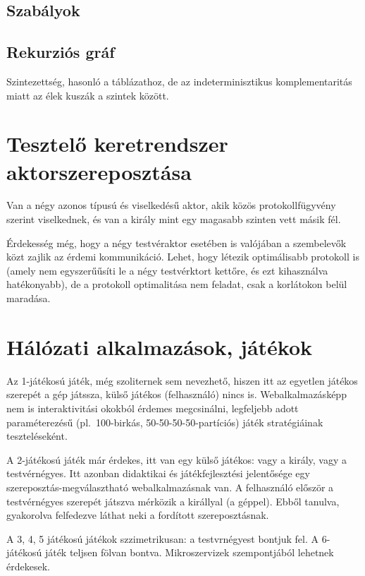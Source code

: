 \documentclass{article}
\begin{document}
	\subsection{Szabályok}

	\subsection{Rekurziós gráf}

	Szintezettség, hasonló a táblázathoz, de az indeterminisztikus komplementaritás miatt az élek kuszák a szintek között.

	\section{Tesztelő keretrendszer aktorszereposztása}

	Van a négy azonos típusú és viselkedésű aktor, akik közös protokollfügyvény szerint viselkednek, és van a király mint egy magasabb szinten vett másik fél.

	Érdekesség még, hogy a négy testvéraktor esetében is valójában a szembelevők közt zajlik az érdemi kommunikáció. Lehet, hogy létezik optimálisabb protokoll is (amely nem egyszerűűsíti le a négy testvérktort kettőre, és ezt kihasználva hatékonyabb), de a protokoll optimalitása nem feladat, csak a korlátokon belül maradása.

	\section{Hálózati alkalmazások, játékok}

	Az 1-játékosú játék, még szoliternek sem nevezhető, hiszen itt az egyetlen játékos szerepét a gép játssza, külső játékos (felhasználó) nincs is. Webalkalmazásképp nem is interaktivitási okokból érdemes megcsinálni, legfeljebb adott paraméterezésű (pl.~100-birkás, 50-50-50-50-partíciós) játék stratégiáinak teszteléseként.

	A 2-játékosú játék már érdekes, itt van egy külső játékos: vagy a király, vagy a testvérnégyes. Itt azonban didaktikai és játékfejlesztési jelentősége egy szereposztás-megválasztható webalkalmazásnak van. A felhasználó először a testvérnégyes szerepét játszva mérközik a királlyal (a géppel). Ebből tanulva, gyakorolva felfedezve láthat neki a fordított szereposztásnak.

	A 3, 4, 5 játékosú játékok szzimetrikusan: a testvrnégyest bontjuk fel. A 6-játékosú játék teljsen fölvan bontva. Mikroszervizek szempontjából lehetnek érdekesek.
\end{document}
